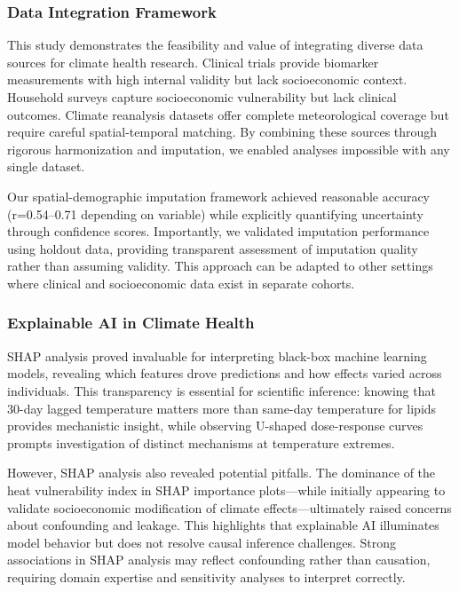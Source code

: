 \subsubsection{Data Integration Framework}

This study demonstrates the feasibility and value of integrating diverse data sources for climate health research. Clinical trials provide biomarker measurements with high internal validity but lack socioeconomic context. Household surveys capture socioeconomic vulnerability but lack clinical outcomes. Climate reanalysis datasets offer complete meteorological coverage but require careful spatial-temporal matching. By combining these sources through rigorous harmonization and imputation, we enabled analyses impossible with any single dataset.

Our spatial-demographic imputation framework achieved reasonable accuracy (r=0.54--0.71 depending on variable) while explicitly quantifying uncertainty through confidence scores. Importantly, we validated imputation performance using holdout data, providing transparent assessment of imputation quality rather than assuming validity. This approach can be adapted to other settings where clinical and socioeconomic data exist in separate cohorts.

\subsubsection{Explainable AI in Climate Health}

SHAP analysis proved invaluable for interpreting black-box machine learning models, revealing which features drove predictions and how effects varied across individuals. This transparency is essential for scientific inference: knowing that 30-day lagged temperature matters more than same-day temperature for lipids provides mechanistic insight, while observing U-shaped dose-response curves prompts investigation of distinct mechanisms at temperature extremes.

However, SHAP analysis also revealed potential pitfalls. The dominance of the heat vulnerability index in SHAP importance plots---while initially appearing to validate socioeconomic modification of climate effects---ultimately raised concerns about confounding and leakage. This highlights that explainable AI illuminates model behavior but does not resolve causal inference challenges. Strong associations in SHAP analysis may reflect confounding rather than causation, requiring domain expertise and sensitivity analyses to interpret correctly.

